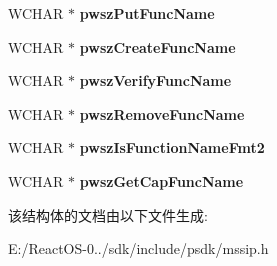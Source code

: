 \begin{DoxyCompactItemize}
W\+C\+H\+AR $\ast$ {\bfseries pwsz\+Put\+Func\+Name}
\item 
\mbox{\label{struct_s_i_p___a_d_d___n_e_w_p_r_o_v_i_d_e_r___a35b8be6590112ff64591445d20239cfd}} 
W\+C\+H\+AR $\ast$ {\bfseries pwsz\+Create\+Func\+Name}
\item 
\mbox{\label{struct_s_i_p___a_d_d___n_e_w_p_r_o_v_i_d_e_r___afb911f89b0d675f5fe80888a0e4770db}} 
W\+C\+H\+AR $\ast$ {\bfseries pwsz\+Verify\+Func\+Name}
\item 
\mbox{\label{struct_s_i_p___a_d_d___n_e_w_p_r_o_v_i_d_e_r___ac0aa318050df0f6b0c198a4e953891d7}} 
W\+C\+H\+AR $\ast$ {\bfseries pwsz\+Remove\+Func\+Name}
\item 
\mbox{\label{struct_s_i_p___a_d_d___n_e_w_p_r_o_v_i_d_e_r___ad10b4065118303b08d2a10df12c4f417}} 
W\+C\+H\+AR $\ast$ {\bfseries pwsz\+Is\+Function\+Name\+Fmt2}
\item 
\mbox{\label{struct_s_i_p___a_d_d___n_e_w_p_r_o_v_i_d_e_r___ac0a1213cd5d6deb278afde955ccf2130}} 
W\+C\+H\+AR $\ast$ {\bfseries pwsz\+Get\+Cap\+Func\+Name}
\end{DoxyCompactItemize}


该结构体的文档由以下文件生成\+:\begin{DoxyCompactItemize}
\item 
E\+:/\+React\+O\+S-\/0../sdk/include/psdk/mssip.\+h\end{DoxyCompactItemize}
